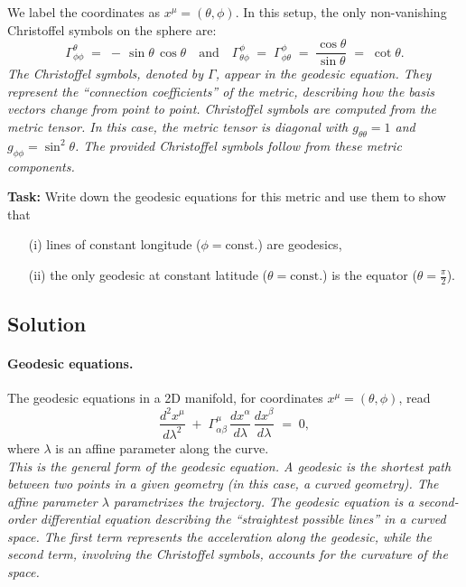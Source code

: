 \documentclass{article}
\begin{document}
We label the coordinates as \(x^{\mu} = (\theta, \phi)\). In this setup, the only non-vanishing Christoffel symbols on the sphere are:
\[
\Gamma_{\phi \phi}^{\theta} 
\;=\; -\,\sin\theta\,\cos\theta
\quad\text{and}\quad
\Gamma_{\theta \phi}^{\phi} 
\;=\; \Gamma_{\phi \theta}^{\phi}
\;=\; \frac{\cos\theta}{\sin\theta}
\;=\; \cot\theta.
\]
\emph{The Christoffel symbols, denoted by \(\Gamma\), appear in the geodesic equation. They represent the ``connection coefficients'' of the metric, describing how the basis vectors change from point to point. Christoffel symbols are computed from the metric tensor. In this case, the metric tensor is diagonal with \(g_{\theta\theta} = 1\) and \(g_{\phi\phi} = \sin^2\theta\). The provided Christoffel symbols follow from these metric components.}

\bigskip

\textbf{Task:} Write down the geodesic equations for this metric and use them to show that
\begin{enumerate}
\item[(i)] lines of constant longitude (\(\phi=\text{const.}\)) are geodesics,
\item[(ii)] the only geodesic at constant latitude (\(\theta = \text{const.}\)) is the equator (\(\theta = \tfrac{\pi}{2}\)).
\end{enumerate}

\subsection*{Solution}

\paragraph{Geodesic equations.}
The geodesic equations in a 2D manifold, for coordinates \(x^\mu=(\theta,\phi)\), read
\[
\frac{d^2 x^\mu}{d\lambda^2}
\;+\;
\Gamma_{\alpha\beta}^\mu \,\frac{dx^\alpha}{d\lambda}\,\frac{dx^\beta}{d\lambda}
\;=\; 0,
\]
where \(\lambda\) is an affine parameter along the curve.\\
\emph{This is the general form of the geodesic equation. A geodesic is the shortest path between two points in a given geometry (in this case, a curved geometry). The affine parameter \(\lambda\) parametrizes the trajectory. The geodesic equation is a second-order differential equation describing the ``straightest possible lines'' in a curved space. The first term represents the acceleration along the geodesic, while the second term, involving the Christoffel symbols, accounts for the curvature of the space.}
\end{document}
